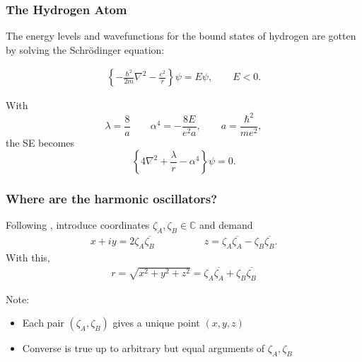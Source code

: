 \documentclass{beamer}
\theoremstyle{definition}
\newcommand{\lc}{\left\{}
\newcommand{\rc}{\right\}}
\newcommand{\f}[2]{\frac{#1}{#2}}
\newcommand{\al}{\alpha}
\begin{document}
\begin{frame}
	\frametitle{The Hydrogen Atom}
	
	The energy levels and wavefunctions for the bound states of hydrogen are gotten by solving the Schr\"{o}dinger equation:
	
	\begin{align*}
	\lc -\f{\hbar^2 }{2m} \nabla^2 - \f{e^2}{r} \rc \psi = E\psi, \quad\quad E < 0.
	\end{align*}
	
	\pause
	
	With
	\begin{equation}
	\label{eq:conds}
	\lambda = \f{8}{a} \quad\quad \al^4 = -\f{8E}{e^2 a}, \quad\quad a = \f{\hbar^2}{m e^2},
	\end{equation}
	the SE becomes
	\begin{equation}\label{eq:SE}
	\lc 4\nabla^2 + \f{\lambda}{r} -\al^4  \rc \psi = 0.
	\end{equation}
	
\end{frame}


\begin{frame}
	\frametitle{Where are the harmonic oscillators? }
	
	Following \cite{cornish1984hydrogen}, introduce coordinates $\zeta_A, \zeta_B \in \mathbb{C}$ and demand
	\begin{align*}
	x + iy = 2 \zeta_A  \overline{\zeta_B} 
	\quad\quad\quad\quad\quad   
	z = \zeta_A \overline{\zeta_A}  -  \zeta_B \overline{\zeta_B}  .
	\end{align*}
	\pause
	With this,
	\begin{align*}
	r = \sqrt{x^2 + y^2 + z^2} = \zeta_A \overline{\zeta_A}  +  \zeta_B \overline{\zeta_B} 
	\end{align*}
	
	Note:
	\begin{itemize}
	\item Each pair $(\zeta_A, \zeta_B)$ gives a unique point $(x,y,z)$
	
	\item Converse is true up to arbitrary but equal arguments of $\zeta_A, \zeta_B$
	\end{itemize}
	
\end{frame}
\end{document}
